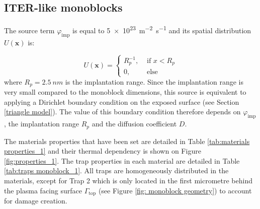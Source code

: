 


\subsection{ITER-like monoblocks}

The source term $\varphi_\mathrm{imp}$ is equal to \SI{5e23}{m^{-2}.s^{-1}} and its spatial distribution $U(\textbf{x})$ is:

\begin{equation}
    U(\textbf{x}) = \begin{cases}
    R_p^{-1},& \text{ if } x < R_p\\
    0,& \text{ else }
    \end{cases}
\end{equation}
where $R_p = \SI{2.5}{nm}$ is the implantation range.
Since the implantation range is very small compared to the monoblock dimensions, this source is equivalent to applying a Dirichlet boundary condition on the exposed surface (see Section \ref{triangle model}).
The value of this boundary condition therefore depends on $\varphi_\mathrm{imp}$, the implantation range $R_p$ and the diffusion coefficient $D$.


The materials properties that have been set are detailed in Table \ref{tab:materials properties_1} and their thermal dependency is shown on Figure \ref{fig:properties_1}.
The trap properties in each material are detailed in Table \ref{tab:traps monoblock_1}.
All traps are homogeneously distributed in the materials, except for Trap 2 which is only located in the first micrometre behind the plasma facing surface $\Gamma_\mathrm{top}$ (see Figure \ref{fig: monoblock geometry}) to account for damage creation.


